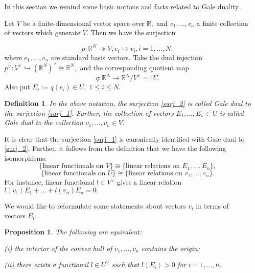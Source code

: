 \documentclass[11pt,leqno]{amsart}
\newtheorem{defi}[theo]{Definition}
\newtheorem{prop}[theo]{Proposition}
\numberwithin{equation}{section}
\def\R{\mathbb{R}}
\begin{document}
In this section we remind some basic notions and facts related to Gale duality.

Let $V$ be a finite-dimensional vector space over $\R,$ and $v_1,\dots,v_n$ a finite collection of vectors which generate $V.$
Then we have the surjection

\begin{equation}\label{surj_1}p:\R^N\twoheadrightarrow V, e_i\mapsto v_i, i=1,\dots,N,\end{equation}
where $e_1,\dots,e_n$ are standard basis vectors.
Take the dual injection $p^{\vee}:V^{\vee}\hookrightarrow \left(\R^N\right)^{\vee}\cong\R^N,$ and the corresponding quotient map
\begin{equation}\label{surj_2}q:\R^N\to\R^N/V^{\vee}=:U.\end{equation}
Also put $E_i:=q\left(e_i\right)\in U,$ $1\leq i\leq N.$

\begin{defi}In the above notation, the surjection \eqref{surj_2} is called Gale dual to the surjection \eqref{surj_1}.
Further, the collection of vectors $E_1,\dots,E_n\in U$ is called Gale dual to the collection
$v_1,\dots,v_n\in V.$\end{defi}

It is clear that the surjection \eqref{surj_1} is canonically identified with Gale dual to \eqref{surj_2}. Further, it follows from the definition that
we have the following isomorphisms:
\begin{equation}\label{funct_V_rel_E}\{\text{linear functionals on }V\}\cong\{\text{linear relations on }E_1,\dots,E_n\},\end{equation}
\begin{equation}\label{funct_U_rel_v}\{\text{linear functionals on }U\}\cong\{\text{linear relations on }v_1,\dots,v_n\}.\end{equation}
For instance, linear functional $l\in V^{\vee}$ gives a linear relation $l\left(v_1\right)E_1+\dots+l\left(v_n\right)E_n=0.$

We would like to reformulate some statements about vectors $v_i$ in terms of vectors $E_i.$

\begin{prop}\label{contains_0}The following are equivalent:

(i)  the interior of the convex hull of $v_1,\dots,v_n$ contains the origin;

(ii) there exists a functional $l\in U^{\vee}$ such that $l\left(E_i\right)>0$ for $i=1,\dots,n.$\end{prop}
\end{document}
